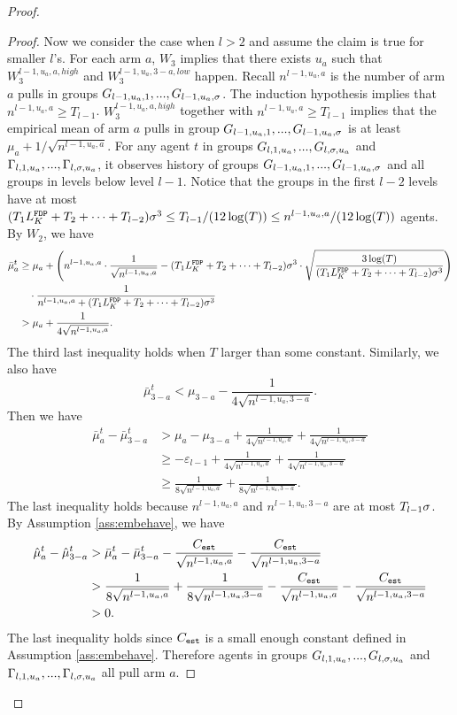 \begin{proof}
\begin{proof}
Now we consider the case when $l > 2$ and assume the claim is true for smaller $l$'s. For each arm $a$, $W_3$ implies that there exists $u_a$ such that $W^{l-1,u_a,a,high}_3$ and $W^{l-1,u_a,3-a,low}_3$ happen. Recall $n^{l-1,u_a,a}$ is the number of arm $a$ pulls in groups $G_{l-1,u_a,1},...,G_{l-1,u_a,\sigma}$. The induction hypothesis implies that $n^{l-1,u_a,a} \geq T_{l-1}$. $W^{l-1,u_a,a,high}_3$ together with $n^{l-1,u_a,a} \geq T_{l-1}$ implies that the empirical mean of arm $a$ pulls in group $G_{l-1,u_a,1},...,G_{l-1,u_a,\sigma}$ is at least $\mu_a + 1/\sqrt{n^{l-1,u_a,a}}$. For any agent $t$ in groups $G_{l,1,u_a},...,G_{l,\sigma,u_a}$ and $\Gamma_{l,1,u_a},...,\Gamma_{l,\sigma,u_a}$, it observes history of groups $G_{l-1,u_a,1},...,G_{l-1,u_a,\sigma}$ and all groups in levels below level $l-1$. Notice that the groups in the first $l-2$ levels have at most $(T_1 L^\mathtt{FDP}_K + T_2 + \cdots +T_{l-2})\sigma^3 \leq T_{l-1}/(12\log(T)) \leq n^{l-1,u_a,a}/(12\log(T))$ agents. By $W_2$, we have
\begin{align*}
\bar{\mu}_a ^t &\geq \mu_a + \left(n^{l-1,u_a,a}  \cdot \frac{1}{\sqrt{n^{l-1,u_a,a} }}- (T_1 L^\mathtt{FDP}_K + T_2 + \cdots +T_{l-2})\sigma^3\cdot \sqrt{\frac{3\log(T)}{ (T_1 L^\mathtt{FDP}_K + T_2 + \cdots +T_{l-2})\sigma^3}} \right) \\
&~~~\cdot \frac{1}{n^{l-1,u_a,a}+ (T_1 L^\mathtt{FDP}_K + T_2 + \cdots +T_{l-2})\sigma^3} \\
&> \mu_a + \frac{1}{4\sqrt{n^{l-1,u_a,a}  }}.
\end{align*}
The third last inequality holds when $T$ larger than some constant.
Similarly, we also have
\[
\bar{\mu}_{3-a}^t < \mu_{3-a}   -\frac{1}{4\sqrt{n^{l-1,u_a,3-a}  }}.
\]
Then we have
\begin{align*}
\bar{\mu}^t_a - \bar{\mu}^t_{3-a} &> \mu_a - \mu_{3-a}+ \frac{1}{4\sqrt{n^{l-1,u_a,a}  }} +\frac{1}{4\sqrt{n^{l-1,u_a,3-a}  }}\\
&\geq -\varepsilon_{l-1}+ \frac{1}{4\sqrt{n^{l-1,u_a,a}  }} +\frac{1}{4\sqrt{n^{l-1,u_a,3-a}  }}\\
&\geq \frac{1}{8\sqrt{n^{l-1,u_a,a}  }} +\frac{1}{8\sqrt{n^{l-1,u_a,3-a}  }}.
\end{align*}
The last inequality holds because $n^{l-1,u_a,a}$ and $n^{l-1,u_a,3-a}$ are at most $T_{l-1} \sigma$. By Assumption \ref{ass:embehave}, we have
\begin{align*}
\hat{\mu}_a^t - \hat{\mu}_{3-a}^t &> \bar{\mu}^t_a - \bar{\mu}^t_{3-a} -  \frac{C_{\mathtt{est}}}{\sqrt{n^{l-1,u_a,a} }} - \frac{C_{\mathtt{est}}}{\sqrt{n^{l-1,u_a,3-a}}}\\
&> \frac{1}{8\sqrt{n^{l-1,u_a,a}  }} +\frac{1}{8\sqrt{n^{l-1,u_a,3-a}  }} -  \frac{C_{\mathtt{est}}}{\sqrt{n^{l-1,u_a,a} }} - \frac{C_{\mathtt{est}}}{\sqrt{n^{l-1,u_a,3-a}}}\\
&>0.
\end{align*}
The last inequality holds since $C_{\mathtt{est}}$ is a small enough constant defined in Assumption \ref{ass:embehave}.
Therefore agents in groups $G_{l,1,u_a},...,G_{l,\sigma,u_a}$ and $\Gamma_{l,1,u_a},...,\Gamma_{l,\sigma,u_a}$ all pull arm $a$.
\end{proof}


\end{proof}
